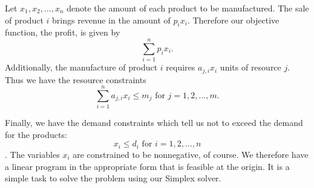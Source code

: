 Let  $x_1, x_2, \ldots, x_n$ denote the amount of each product to be manufactured.
The sale of product $i$ brings revenue in the amount of $p_ix_i$.
Therefore our objective function, the profit, is given by
\[
\sum_{i=1}^n p_ix_i.
\]
Additionally, the manufacture of product $i$ requires $a_{j,i}x_i$ units of resource $j$.
Thus we have the resource constraints
\[
\sum_{i=1}^n a_{j,i}x_i \leq m_j  \text{ for } j = 1, 2, \ldots, m.
\]

Finally, we have the demand constraints which tell us not to exceed the demand for the products:
\[
x_i \leq d_i \text{ for } i = 1, 2, \ldots, n
\]
.
The variables $x_i$ are constrained to be nonnegative, of course. We therefore have a linear program in the appropriate form that is feasible at the origin.
It is a simple task to solve the problem using our Simplex solver.

